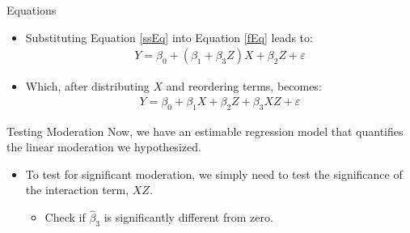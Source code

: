\documentclass{beamer}\usepackage[]{graphicx}\usepackage[]{color}
\begin{document}

\begin{frame}{Equations}
  
  \begin{itemize}
  \item Substituting Equation \ref{ssEq} into Equation \ref{fEq} leads to:
    \begin{align*}
      Y = \beta_0 + (\beta_1 + \beta_3Z)X + \beta_2Z + \varepsilon
    \end{align*}
    \pause
  \item Which, after distributing $X$ and reordering terms, becomes:
    \begin{align*}
      Y = \beta_0 + \beta_1X + \beta_2Z + \beta_3XZ + \varepsilon
    \end{align*}
  \end{itemize}
  
\end{frame}


\begin{frame}{Testing Moderation}
  Now, we have an estimable regression model that quantifies the linear 
  moderation we hypothesized.
  \vb
  \begin{center}\end{center}
  \vc
  \begin{itemize}
  \item To test for significant moderation, we simply need to test the 
    significance of the interaction term, $XZ$.
    \begin{itemize}
    \item Check if $\hat{\beta}_3$ is significantly different from zero.
    \end{itemize}
  \end{itemize}
  
\end{frame}

\end{document}
